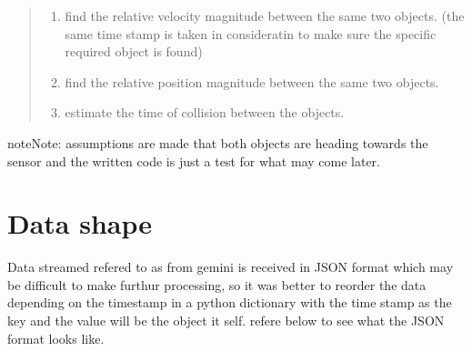 \documentclass[letterpaper,10pt,english]{sphinxmanual}
\begin{document}
\begin{quote}
\begin{enumerate}
\item {} 
\sphinxAtStartPar
find the relative velocity magnitude between the same two objects. (the same time stamp is taken in consideratin to make sure the specific required object is found)

\item {} 
\sphinxAtStartPar
find the relative position magnitude between the same two objects.

\item {} 
\sphinxAtStartPar
estimate the time of collision between the objects.

\end{enumerate}
\end{quote}

\begin{sphinxadmonition}{note}{Note:}
\sphinxAtStartPar
assumptions are made that both objects are heading towards the sensor and the written code is just a test for what may come later.
\end{sphinxadmonition}


\section{Data shape}
\label{\detokenize{projectdoc:data-shape}}
\sphinxAtStartPar
Data streamed refered to as  from gemini is received in JSON format which may be difficult to make furthur processing, so it was better to reorder the data depending on the timestamp
in a python dictionary with the time stamp as the key and the value will be the object it self. refere below to see what the JSON format looks like.
\end{document}
